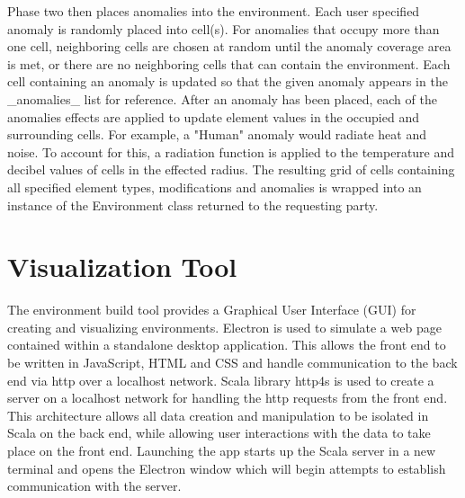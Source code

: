 Phase two then places anomalies into the environment.
Each user specified anomaly is randomly placed into cell(s).
For anomalies that occupy more than one cell, neighboring cells are chosen at random until the anomaly coverage area is met, or there are no neighboring cells that can contain the environment.
Each cell containing an anomaly is updated so that the given anomaly appears in the _anomalies_ list for reference.
After an anomaly has been placed, each of the anomalies effects are applied to update element values in the occupied and surrounding cells.
For example, a "Human" anomaly would radiate heat and noise.
To account for this, a radiation function  is applied to the temperature and decibel values of cells in the effected radius.
The resulting grid of cells containing all specified element types, modifications and anomalies is wrapped into an instance of the Environment class returned to the requesting party.



\section{Visualization Tool}
The environment build tool provides a Graphical User Interface (GUI) for creating and visualizing environments.
Electron  is used to simulate a web page contained within a standalone desktop application.
This allows the front end to be written in JavaScript, HTML and CSS and handle communication to the back end via http over a localhost network.
Scala library http4s  is used to create a server on a localhost network for handling the http requests from the front end.
This architecture allows all data creation and manipulation to be isolated in Scala on the back end, while allowing user interactions with the data to take place on the front end.
Launching the app starts up the Scala server in a new terminal and opens the Electron window which will begin attempts to establish communication with the server.


